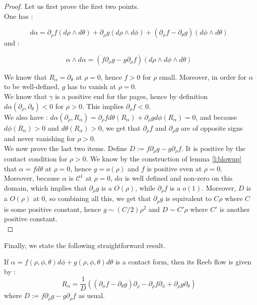 \documentclass[../main.tex]{subfiles}
\begin{document}
\begin{proof}
Let us first prove the first two points.\\
One has : 

$$d\alpha = \partial_\rho f (d\rho\wedge d\theta) + \partial_\rho g (d\rho \wedge d\phi) + (\partial_\phi f - \partial_\theta g)(d\phi\wedge d\theta)$$
and :

$$\alpha\wedge d\alpha = (f\partial_\rho g - g\partial_\rho f)(d\rho\wedge d\phi\wedge d\theta)$$

We know that $R_\alpha = \partial_\theta$ at $\rho = 0$, hence $f> 0$ for $\rho$ small. Moreover, in order for $\alpha$ to be well-defined, $g$ has to vanish at $\rho = 0$.\\

We know that $\gamma$ is a positive end for the pages, hence by definition $d\alpha(\partial_\rho,\partial_\theta) < 0$ for $\rho > 0$. This implies $\partial_\rho f < 0$.\\
We also have : $d\alpha(\partial_\rho,R_\alpha) = \partial_\rho f d\theta(R_\alpha) + \partial_\rho g d\phi(R_\alpha) = 0$, and because $d\phi(R_\alpha) >0$ and $d\theta(R_\alpha) >0$, we get that $\partial_\rho f $ and $\partial_\rho g$ are of opposite signs and never vanishing for $\rho > 0$. \\

We now prove the last two items. Define $D := f\partial_\rho g - g\partial_\rho f$. It is positive by the contact condition for $\rho > 0$. We know by the construction of lemma \ref{l:blowup} that $\alpha = fd\theta$ at $\rho = 0$, hence $g = o(\rho)$ and $f$ is positive even at $\rho = 0$.\\

Moreover, because $\alpha$ is $\mathcal{C}^1$ at $\rho = 0$, $d\alpha$ is well defined and non-zero on this domain, which implies that $\partial_\rho g$ is a $O(\rho)$, while $\partial_\rho f$ is a $o(1)$. Moreover, $D$ is a $O(\rho)$ at $0$, so combining all this, we get that $\partial_\rho g$ is equivalent to $C\rho$ where $C$ is some positive constant, hence $g\sim (C/2) \rho^2$ and $D\sim C'\rho$ where $C'$ is another positive constant.  \\


\end{proof}


Finally, we state the following straightforward result.

 \begin{lemma}\label{l:ReebFlowFormula}
If $\alpha = f(\rho,\phi,\theta)d\phi + g(\rho,\phi,\theta)d\theta$ is a contact form, then its Reeb flow is given by : $$R_\alpha = \frac{1}{D}((\partial_\phi f - \partial_\theta g)\partial_\rho - \partial_\rho f \partial_\phi  + \partial_\rho g\partial_\theta)$$ where $D := f\partial_\rho g - g\partial_\rho f$ as usual.
 \end{lemma}
\end{document}
